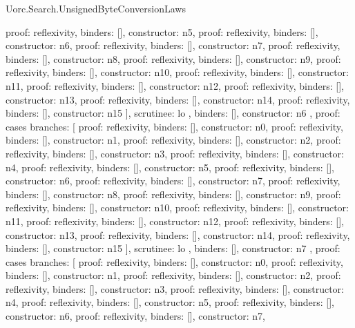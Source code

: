 \begin{lexlean}{Uorc.Search.UnsignedByteConversionLaws}
\begin{semanticmodule}
{{{{            {proof: reflexivity{}, binders: [], constructor: n5},
            {proof: reflexivity{}, binders: [], constructor: n6},
            {proof: reflexivity{}, binders: [], constructor: n7},
            {proof: reflexivity{}, binders: [], constructor: n8},
            {proof: reflexivity{}, binders: [], constructor: n9},
            {proof: reflexivity{}, binders: [], constructor: n10},
            {proof: reflexivity{}, binders: [], constructor: n11},
            {proof: reflexivity{}, binders: [], constructor: n12},
            {proof: reflexivity{}, binders: [], constructor: n13},
            {proof: reflexivity{}, binders: [], constructor: n14},
            {proof: reflexivity{}, binders: [], constructor: n15}
          ],
          scrutinee: lo
        },
        binders: [],
        constructor: n6
      },
      {
        proof: cases{
          branches: [
            {proof: reflexivity{}, binders: [], constructor: n0},
            {proof: reflexivity{}, binders: [], constructor: n1},
            {proof: reflexivity{}, binders: [], constructor: n2},
            {proof: reflexivity{}, binders: [], constructor: n3},
            {proof: reflexivity{}, binders: [], constructor: n4},
            {proof: reflexivity{}, binders: [], constructor: n5},
            {proof: reflexivity{}, binders: [], constructor: n6},
            {proof: reflexivity{}, binders: [], constructor: n7},
            {proof: reflexivity{}, binders: [], constructor: n8},
            {proof: reflexivity{}, binders: [], constructor: n9},
            {proof: reflexivity{}, binders: [], constructor: n10},
            {proof: reflexivity{}, binders: [], constructor: n11},
            {proof: reflexivity{}, binders: [], constructor: n12},
            {proof: reflexivity{}, binders: [], constructor: n13},
            {proof: reflexivity{}, binders: [], constructor: n14},
            {proof: reflexivity{}, binders: [], constructor: n15}
          ],
          scrutinee: lo
        },
        binders: [],
        constructor: n7
      },
      {
        proof: cases{
          branches: [
            {proof: reflexivity{}, binders: [], constructor: n0},
            {proof: reflexivity{}, binders: [], constructor: n1},
            {proof: reflexivity{}, binders: [], constructor: n2},
            {proof: reflexivity{}, binders: [], constructor: n3},
            {proof: reflexivity{}, binders: [], constructor: n4},
            {proof: reflexivity{}, binders: [], constructor: n5},
            {proof: reflexivity{}, binders: [], constructor: n6},
            {proof: reflexivity{}, binders: [], constructor: n7},
}}}}
\end{semanticmodule}
\end{lexlean}
